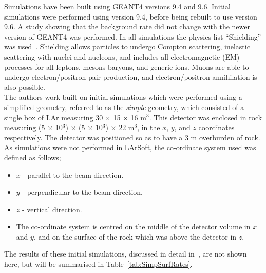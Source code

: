 Simulations have been built using GEANT4 versions 9.4 and 9.6. Initial simulations were performed using version 9.4, before being rebuilt to use version 9.6. A study showing that the background rate did not change with the newer version of GEANT4 was performed. In all simulations the physics list ``Shielding'' was used~\citep{Shielding}. Shielding allows particles to undergo Compton scattering, inelastic scattering with nuclei and nucleons, and includes all electromagnetic (EM) processes for all leptons, mesons baryons, and generic ions. Muons are able to undergo electron/positron pair production, and electron/positron annihilation is also possible. \\

The authors work built on initial simulations which were performed using a simplified geometry, referred to as the \emph{simple} geometry, which consisted of a single box of LAr measuring 30 $\times$ 15 $\times$ 16 m$^3$. This detector was enclosed in rock measuring (5 $\times$ 10$^3$) $\times$ (5 $\times$ 10$^3$) $\times$ 22 m$^{3}$, in the $x$, $y$, and $z$ coordinates respectively. The detector was positioned so as to have a 3 m overburden of rock. As simulations were not performed in LArSoft, the co-ordinate system used was defined as follows;
\begin{itemize}
\item $x$ - parallel to the beam direction.
\item $y$ - perpendicular to the beam direction.
\item $z$ - vertical direction.
\item The co-ordinate system is centred on the middle of the detector volume in $x$ and $y$, and on the surface of the rock which was above the detector in $z$.
\end{itemize}
The results of these initial simulations, discussed in detail in~\citep{MartinsThesis}, are not shown here, but will be summarised in Table~\ref{tab:SimpSurfRates}. \\

